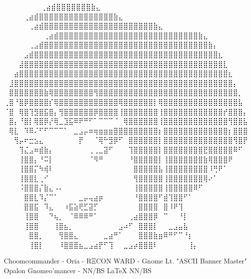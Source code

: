 \iffalse

  ⠀⠀⠀⠀⠀             ⠀⠀⢀⣴⣾⣿⣿⣿⣿⣿⣿⣿⣷⣄⠀⠀⠀⠀⠀⠀⠀⠀
⠀⠀⠀  ⠀      ⠀⠀⠀⠀⢀⣴⣾⣿⣿⣿⣿⣿⣿⣿⣿⣿⣿⣿⣿⣿⣿⣿⣷⣄⠀⠀⠀⠀⠀⠀⠀⠀
⠀⠀ ⠀   ⠀⠀⠀⠀⠀⢀⣴⣾⣿⣿⣿⣿⣿⣿⣿⣿⣿⣿⣿⣿⣿⣿⣿⣿⣿⣿⣿⣿⣿⣿⣷⣄⠀⠀⠀⠀⠀⠀⠀⠀
⠀⠀⠀⠀⠀⠀⠀⠀⢀⣴⣾⣿⣿⣿⣿⣿⣿⣿⣿⣿⣿⣿⣿⣿⣿⣿⣿⣿⣿⣿⣿⣿⣿⣿⣿⣿⣿⣿⣿⣷⣄⠀⠀⠀⠀⠀⠀⠀⠀
⠀⠀⠀⠀⠀⢀⣠⣾⣿⣿⣿⣿⣿⣿⣿⣿⣿⣿⣿⣿⣿⣿⣿⣿⣿⣿⣿⣿⣿⣿⣿⣿⣿⣿⣿⣿⣿⣿⣿⣿⣿⣷⡄⠀⠀⠀⠀⠀⠀
⠀⠀⠀⠀⣠⣾⣿⣿⣿⣿⣿⣿⣿⣿⣿⣿⣿⣿⣿⣿⣿⣿⣿⣿⣿⣿⣿⣿⣿⣿⣿⣿⣿⣿⣿⣿⣿⣿⣿⣿⣿⣿⣿⣆⠀⠀⠀⠀⠀
⠀⠀⠀⣼⣿⣿⣿⣿⣿⣿⣿⣿⣿⣿⣿⣿⣿⣿⣿⣿⣿⣿⣿⣿⣿⣿⣿⣿⣿⣿⣿⣿⣿⣿⣿⣿⣿⣿⣿⣿⣿⣿⣿⣿⣇⠀⠀⠀⠀
⠀⠀⣴⣿⣿⣿⣿⣿⣿⣿⣿⣿⣿⣿⣿⣿⣿⣿⣿⣿⣿⣿⣿⣿⣿⣿⣿⣿⣿⣿⣿⣿⣿⣿⣿⣿⣿⣿⣿⣿⣿⣿⣿⣿⣿⣆⠀⠀⠀
⠀⣸⣿⣿⣿⣿⣿⣿⣿⣿⣿⣿⣿⣿⣿⣿⣿⣿⣿⣿⣿⣿⣿⣿⣿⣿⣿⣿⣿⣿⣿⣿⣿⣿⣿⣿⣿⣿⣿⣿⣿⣿⣿⣿⣿⣿⡄⠀⠀
⠀⣿⣿⣿⣿⣿⣿⣿⣷⢿⣿⣿⣿⣿⣿⣿⣿⣿⢻⣿⣿⣿⣿⣿⣿⣿⣿⣿⣿⣿⣿⣿⣿⣿⣿⣿⣿⣿⣿⣿⣿⣿⣿⣿⣿⣿⣿⡀⠀
⢀⣿⠘⣿⡿⣿⣿⣿⣿⡎⢿⣿⣿⣿⣿⣿⣿⣿⣿⣿⣿⣿⣿⢿⣿⣿⣿⣿⣿⣿⡇⢿⣿⣿⣿⣿⣿⣿⣿⣿⣿⣿⣿⣿⣿⣿⣿⣧⠀
⠈⣿⠀⢿⣿⢹⣻⣿⣯⣿⡄⢻⣿⣿⣿⣿⣿⣿⡿⣿⣿⣿⣿⢸⣿⣿⣿⣿⣿⣿⣿⢸⣿⣿⣿⣿⣿⣿⣿⣿⣿⣿⣿⣿⡞⣿⣿⣿⡄
⠀⣿⡄⠘⣿⡇⢿⣿⡿⡜⢿⣀⣹⣯⠿⠟⠛⠋⠁⠉⠉⠉⠈⠀⢿⣿⣿⣿⣿⣿⣿⢸⣿⣿⣿⣿⣿⣿⣿⣿⣿⣿⣿⣿⣿⢻⣿⣿⣧
⠀⢿⣇⠀⠹⠿⠌⠋⠋⠉⠉⠉⠁⠀⣀⣠⡤⠶⢶⣶⣶⣶⣿⣿⣿⣿⣿⣿⣿⣿⣿⡆⣿⣿⣿⣿⣿⣿⣿⣿⣿⣿⣿⣿⣿⡆⣿⣿⣿
⠀⠀⢻⡤⠖⣒⣢⣄⠀⠀⠀⠀⠀⠀⠀⡟⠀⠀⠈⢿⠓⣻⡿⠋⠀⣿⣿⣿⣿⣿⣿⡇⣿⣿⣿⣿⣿⣿⣿⣿⣿⣿⣿⣿⣿⣿⢻⣿⡟
⠀⠀⠀⢹⣌⣠⠶⣾⣷⡄⠀⠀⠀⠀⠀⠀⠀⢀⢀⣀⣽⠋⠀⠀⠀⢹⣿⣿⣿⣿⣿⡇⣿⣿⣿⣿⣿⣿⣿⣿⣟⣿⣿⣿⣿⣿⠿⠋⠀
⠀⠀⠀⢸⣿⣿⡄⠘⠭⡇⠀⠀⠀⠀⠀⠀⠀⠈⠻⠛⠀⠀⠀⠀⠀⠘⣿⣿⣿⣿⣿⡇⢸⣿⣿⣿⣿⣿⣿⣿⣷⢿⣿⣿⣿⠟⠀⠀⠀
⠀⠀⠀⢸⣿⣿⡍⠳⢾⠇⠀⠀⠀⠀⠀⠀⠀⠀⠀⠀⠀⠀⠀⠀⠀⠀⣿⣿⣿⣿⣿⣧⢸⣿⣿⣿⣿⣿⣿⣿⣿⠸⢛⠟⠁⠀⠀⠀⠀
⠀⠀⠀⢸⣿⣿⣇⢀⠊⠀⠀⠀⠀⠀⠀⠀⠀⠀⠀⠀⠀⠀⠀⠀⠀⠀⢻⣿⣿⣿⣿⣿⢸⣿⣿⣿⣿⣿⣿⣿⢿⠔⠁⠀⠀⠀⠀⠀⠀
⠀⠀⠀⠨⣿⣿⣿⡌⣷⣄⠠⠄⠀⠀⠀⠀⠀⠀⠀⠀⠀⠀⠀⠀⠀⠀⢸⣿⣿⣿⣿⣿⢸⣿⣿⣿⣿⣿⠿⠋⠀⠀⠀⠀⠀⠀⠀⠀⠀
⠀⠀⠀⠀⣿⣿⣇⠹⡌⠉⠁⠀⠀⠀⠀⣀⡤⢤⣴⡶⠀⠀⠀⠀⠀⠀⠘⣿⣿⣿⣿⠋⣾⢹⣿⣿⠋⠁⠀⠀⠀⠀⠀⠀⠀⠀⠀⠀⠀
⠀⠀⠀⠀⣿⣿⣯⠀⠹⣄⠀⠀⠰⣯⣵⢟⣋⣽⡋⠀⠀⠀⠀⠀⠀⠀⠀⣿⣿⣿⣿⠀⣿⠸⠟⢹⠀⠀⠀⠀⠀⠀⠀⠀⠀⠀⠀⠀⠀
⠀⠀⠀⠀⢸⣿⣿⠀⠀⠙⢦⡀⠀⠈⠿⠿⠿⠛⠁⠀⠀⠀⠀⠀⠀⢀⣴⣿⣿⣿⡿⠀⠉⠀⠀⠘⡇⠀⠀⠀⠀⠀⠀⠀⠀⠀⠀⠀⠀
⠀⠀⠀⠀⢸⣿⣿⠀⠀⠀⢸⣿⣦⡀⠀⠀⠀⠀⠀⠀⠀⠀⠀⣠⠴⠋⠀⣿⣿⣿⡇⠀⠀⣀⣠⣤⣧⠀⠀⠀⠀⠀⠀⠀⠀⠀⠀⠀⠀
⠀⠀⠀⠀⠀⣿⣿⡀⠀⠀⠀⢻⣿⣿⣄⠀⠀⠀⠀⠀⣀⣴⠛⠁⠀⠀⠀⣿⣿⣿⣷⣶⠿⠛⠋⠉⠘⡆⠀⠀⠀⠀⠀⠀⠀⠀⠀⠀⠀
⠀⠀⠀⠀⠀⢸⣿⡇⠀⠀⠀⠸⣿⣿⣿⣦⣀⣠⣴⡟⠋⢹⠀⠀⣀⣠⡴⣿⣿⣿⠇⠀⠀⠀⠀⠀⠀⢸⡄⠀⠀⠀⠀⠀⠀⠀⠀⠀⠀

Choomcommander - Oria - RΞCON WARD - Gnome Lt. "ASCII Banner Master"
             Opalon Gnomeo'mancer - NN/BS LaTeX{} NN/BS

